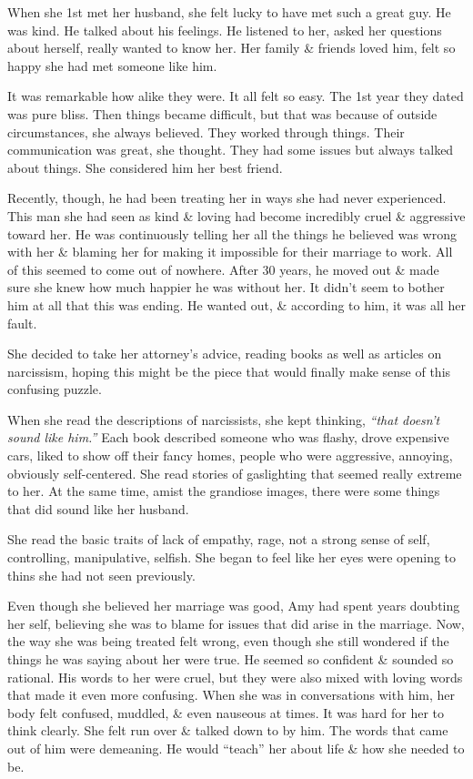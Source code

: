\documentclass{article}
\numberwithin{equation}{section}
\begin{document}
When she 1st met her husband, she felt lucky to have met such a great guy. He was kind. He talked about his feelings. He listened to her, asked her questions about herself, really wanted to know her. Her family \& friends loved him, felt so happy she had met someone like him.

It was remarkable how alike they were. It all felt so easy. The 1st year they dated was pure bliss. Then things became difficult, but that was because of outside circumstances, she always believed. They worked through things. Their communication was great, she thought. They had some issues but always talked about things. She considered him her best friend.

Recently, though, he had been treating her in ways she had never experienced. This man she had seen as kind \& loving had become incredibly cruel \& aggressive toward her. He was continuously telling her all the things he believed was wrong with her \& blaming her for making it impossible for their marriage to work. All of this seemed to come out of nowhere. After 30 years, he moved out \& made sure she knew how much happier he was without her. It didn't seem to bother him at all that this was ending. He wanted out, \& according to him, it was all her fault.

She decided to take her attorney's advice, reading books as well as articles on narcissism, hoping this might be the piece that would finally make sense of this confusing puzzle.

When she read the descriptions of narcissists, she kept thinking, \textit{``that doesn't sound like him.''} Each book described someone who was flashy, drove expensive cars, liked to show off their fancy homes, people who were aggressive, annoying, obviously self-centered. She read stories of gaslighting that seemed really extreme to her. At the same time, amist the grandiose images, there were some things that did sound like her husband.

She read the basic traits of lack of empathy, rage, not a strong sense of self, controlling, manipulative, selfish. She began to feel like her eyes were opening to thins she had not seen previously.

Even though she believed her marriage was good, Amy had spent years doubting her self, believing she was to blame for issues that did arise in the marriage. Now, the way she was being treated felt wrong, even though she still wondered if the things he was saying about her were true. He seemed so confident \& sounded so rational. His words to her were cruel, but they were also mixed with loving words that made it even more confusing. When she was in conversations with him, her body felt confused, muddled, \& even nauseous at times. It was hard for her to think clearly. She felt run over \& talked down to by him. The words that came out of him were demeaning. He would ``teach'' her about life \& how she needed to be.
\end{document}
